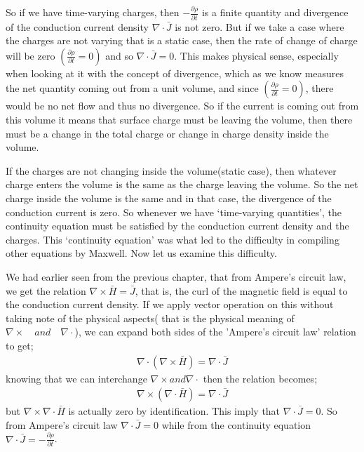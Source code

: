 So if we have time-varying charges, then $-\frac{\partial\rho}{\partial t}$ is a finite quantity and divergence of the conduction current density $\nabla\cdot\bar{J}$ is not zero. But if we take a case where the charges are not varying that is a static case, then the rate of change of charge will be zero $(\frac{\partial\rho}{\partial t}=0)$ and so $\nabla\cdot\bar{J}=0$. This makes physical sense, especially when looking at it with the concept of divergence, which as we know measures the net quantity coming out from a unit volume, and since $(\frac{\partial\rho}{\partial t}=0)$, there would be no net flow and thus no divergence. So if the current is coming out from this volume it means that surface charge must be leaving the volume, then there must be a change in the total charge or change in charge density inside the volume.

If the charges are not changing inside the volume(static case), then whatever charge enters the volume is the same as the charge leaving the volume. So the net charge inside the volume is the same and in that case, the divergence of the conduction current is zero. So whenever we have `time-varying quantities', the continuity equation must be satisfied by the conduction current density and the charges. This `continuity equation' was what led to the difficulty in compiling other equations by Maxwell. Now let us examine this difficulty.

We had earlier seen from the previous chapter, that from Ampere's circuit law, we get the relation $\nabla\times\bar{H}=\bar{J}$, that is, the curl of the magnetic field is equal to the conduction current density. If we apply vector operation on this without taking note of the physical aspects( that is the physical meaning of $\nabla\times\quad and\quad \nabla\cdot$), we can expand both sides of the 'Ampere's circuit law' relation to get;
\begin{align}
\nabla\cdot(\nabla\times\bar{H})=\nabla\cdot\bar{J}
\end{align}
knowing that we can interchange $\nabla\times and \nabla\cdot$ then the relation becomes;
\begin{align}
\nabla\times(\nabla\cdot\bar{H})=\nabla\cdot\bar{J}
\end{align}
but $\nabla\times\nabla\cdot\bar{H}$ is actually zero by identification. This imply that $\nabla\cdot\bar{J}=0$. So from Ampere's circuit law $\nabla\cdot\bar{J}=0$ while from the continuity equation $\nabla\cdot\bar{J}=-\frac{\partial\rho}{\partial t}$.

